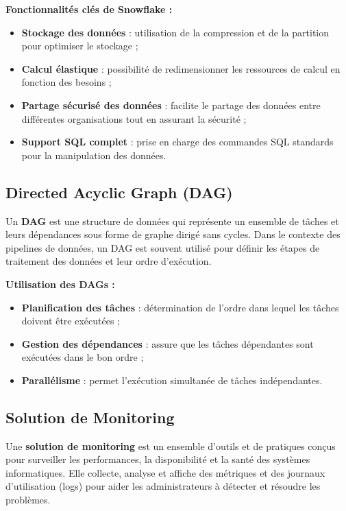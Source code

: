     \textbf{Fonctionnalités clés de Snowflake :}
    \begin{itemize}
        \item \textbf{Stockage des données} : utilisation de la compression et de la partition pour optimiser le stockage ;
        \item \textbf{Calcul élastique} : possibilité de redimensionner les ressources de calcul en fonction des besoins ;
        \item \textbf{Partage sécurisé des données} : facilite le partage des données entre différentes organisations tout en assurant la sécurité ;
        \item \textbf{Support SQL complet} : prise en charge des commandes SQL standards pour la manipulation des données.
    \end{itemize}
    
    \subsection{Directed Acyclic Graph (DAG)}
    
    Un \textbf{DAG} est une structure de données qui représente un ensemble de tâches et leurs dépendances sous forme
     de graphe dirigé sans cycles\cite{dagdef}. Dans le contexte des pipelines de données, un DAG est souvent utilisé pour définir les étapes de traitement des données et leur ordre d'exécution.
    
    \textbf{Utilisation des DAGs :}
    \begin{itemize}
        \item \textbf{Planification des tâches} : détermination de l'ordre dans lequel les tâches doivent être exécutées ; 
        \item \textbf{Gestion des dépendances} : assure que les tâches dépendantes sont exécutées dans le bon ordre ;
        \item \textbf{Parallélisme} : permet l'exécution simultanée de tâches indépendantes.
    \end{itemize}
    
    \subsection{Solution de Monitoring}
    
    Une \textbf{solution de monitoring} est un ensemble d'outils et de pratiques conçus pour surveiller les performances,
     la disponibilité et la santé des systèmes informatiques. Elle collecte, analyse et affiche des métriques et des journaux d'utilisation (logs)  
     pour aider les administrateurs à détecter et résoudre les problèmes\cite{monitoring}.
    
